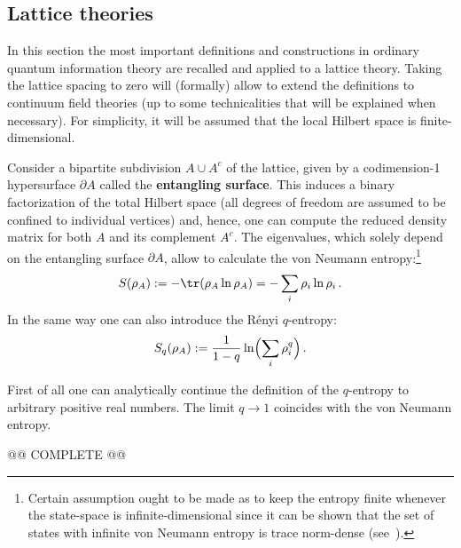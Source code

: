 \subsection{Lattice theories}

    In this section the most important definitions and constructions in ordinary quantum information theory are recalled and applied to a lattice theory. Taking the lattice spacing to zero will (formally) allow to extend the definitions to continuum field theories (up to some technicalities that will be explained when necessary). For simplicity, it will be assumed that the local Hilbert space is finite-dimensional.

    Consider a bipartite subdivision $A\cup A^c$ of the lattice, given by a codimension-1 hypersurface $\partial A$ called the \textbf{entangling surface}. This induces a binary factorization of the total Hilbert space (all degrees of freedom are assumed to be confined to individual vertices) and, hence, one can compute the reduced density matrix for both $A$ and its complement $A^c$. The eigenvalues, which solely depend on the entangling surface $\partial A$, allow to calculate the von Neumann entropy:\footnote{Certain assumption ought to be made as to keep the entropy finite whenever the state-space is infinite-dimensional since it can be shown that the set of states with infinite von Neumann entropy is trace norm-dense (see~\citet{eisert_quantification_2002}).}
    \begin{gather}
        S(\rho_A) := -\tr(\rho_A\ln\rho_A) = -\sum_i\rho_i\ln\rho_i\,.
    \end{gather}
    In the same way one can also introduce the R\'enyi $q$-entropy:
    \begin{gather}
        S_q(\rho_A) := \frac{1}{1-q}\ln\Bigl(\sum_i\rho_i^q\Bigr)\,.
    \end{gather}
    \begin{property}
         First of all one can analytically continue the definition of the $q$-entropy to arbitrary positive real numbers. The limit $q\longrightarrow1$ coincides with the von Neumann entropy.
    \end{property}

    @@ COMPLETE @@